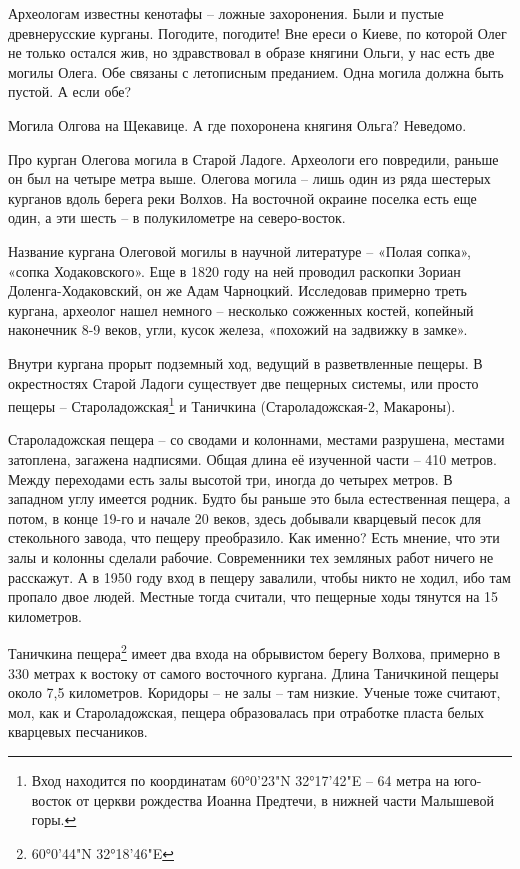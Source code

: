 Археологам известны кенотафы – ложные захоронения. Были и пустые древнерусские курганы. Погодите, погодите! Вне ереси о Киеве, по которой Олег не только остался жив, но здравствовал в образе княгини Ольги, у нас есть две могилы Олега. Обе связаны с летописным преданием. Одна могила должна быть пустой. А если обе?

Могила Олгова на Щекавице. А где похоронена княгиня Ольга? Неведомо.

Про курган Олегова могила в Старой Ладоге. Археологи его повредили, раньше он был на четыре метра выше. Олегова могила – лишь один из ряда шестерых курганов вдоль берега реки Волхов. На восточной окраине поселка есть еще один, а эти шесть – в полукилометре на северо-восток.

Название кургана Олеговой могилы в научной литературе – «Полая сопка», «сопка Ходаковского». Еще в 1820 году на ней проводил раскопки Зориан Доленга-Ходаковский, он же Адам Чарноцкий. Исследовав примерно треть кургана, археолог нашел немного – несколько сожженных костей, копейный наконечник 8-9 веков, угли, кусок железа, «похожий на задвижку в замке».

Внутри кургана прорыт подземный ход, ведущий в разветвленные пещеры. В окрестностях Старой Ладоги существует две пещерных системы, или просто пещеры – Староладожская\footnote{Вход находится по координатам 60°0'23"N 32°17'42"E – 64 метра на юго-восток от церкви рождества Иоанна Предтечи, в нижней части Малышевой горы.} и Таничкина (Староладожская-2, Макароны).

Староладожская пещера – со сводами и колоннами, местами разрушена, местами затоплена, загажена надписями. Общая длина её изученной части – 410 метров. Между переходами есть залы высотой три, иногда до четырех метров. В западном углу имеется родник. Будто бы раньше это была естественная пещера, а потом, в конце 19-го и начале 20 веков, здесь добывали кварцевый песок для стекольного завода, что пещеру преобразило. Как именно? Есть мнение, что эти залы и колонны сделали рабочие. Современники тех земляных работ ничего не расскажут. А в 1950 году вход в пещеру завалили, чтобы никто не ходил, ибо там пропало двое людей. Местные тогда считали, что пещерные ходы тянутся на 15 километров.

Таничкина пещера\footnote{60°0'44"N 32°18'46"E} имеет два входа на обрывистом берегу Волхова, примерно в 330 метрах к востоку от самого восточного кургана. Длина Таничкиной пещеры около 7,5 километров. Коридоры – не залы – там низкие. Ученые тоже считают, мол, как и Староладожская, пещера образовалась при отработке пласта белых кварцевых песчаников. 

